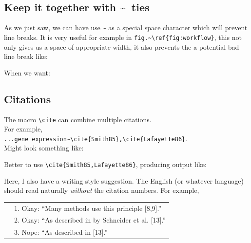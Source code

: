 \documentclass{article}
\newcommand*\𝚝[1]{\texttt{#1}}%
\begin{document}
\subsection*{Keep it together with \textasciitilde\ ties}
As we just saw, we can have use \verb|~| as a special space character which will prevent line breaks.
It is very useful for example in \verb|fig.~\ref{fig:workflow}|, this not only gives us a space of appropriate width,
it also prevents the a potential bad line break like:

\begin{center}\end{center}

When we want:

\begin{center}\end{center}



\subsection*{Citations}
The macro \verb|\cite| can combine multiple citations.\\
For example,\\
\verb|...gene expression~\cite{Smith85},\cite{Lafayette86}|.\\
Might look something like:
\begin{center}\end{center}

Better to use \verb|\cite{Smith85,Lafayette86}|, producing output like:
\begin{center}\end{center}

Here, I also have a writing style suggestion.
The English (or whatever language) should read naturally \textit{without} the citation numbers.
For example,

{\renewcommand{\arraystretch}{1.5}
\begin{tabular}{p{3em}l}
 &  1. Okay:  ``Many methods use this principle [8,9].''\\
 &  2. Okay:  ``As described in by Schneider et al. [13].''\\
 &  3. Nope:  ``As described in [13].''
\end{tabular}
}
\end{document}
